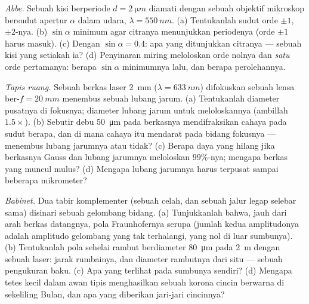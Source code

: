 \begin{exercise}[$\star\star$]\label{exo:b2:diffraction:8}
\emph{Abbe.} Sebuah kisi berperiode $d = \qty{2}{\micro m}$ diamati dengan sebuah
objektif mikroskop bersudut apertur $\alpha$ dalam udara, $\lambda = \qty{550}{nm}$.
(a) Tentukanlah sudut orde $\pm1$, $\pm2$-nya. (b) $\sin\alpha$ minimum agar citranya
menunjukkan periodenya (orde $\pm1$ harus masuk). (c) Dengan $\sin\alpha = 0.4$: apa
yang ditunjukkan citranya --- sebuah kisi yang setiakah ia? (d) Penyinaran
miring meloloskan orde nolnya dan \emph{satu} orde pertamanya:
berapa $\sin\alpha$ minimumnya lalu, dan berapa perolehannya.
\end{exercise}

\begin{exercise}[$\star\star$]\label{exo:b2:diffraction:9}
\emph{Tapis ruang.} Sebuah berkas laser \qty{2}{mm} ($\lambda = \qty{633}{nm}$)
difokuskan sebuah lensa ber-$f = \qty{20}{mm}$ menembus sebuah lubang jarum. (a) Tentukanlah diameter
 pusatnya di fokusnya; diameter lubang jarum untuk meloloskannya
(ambillah $1.5\times$). (b) Sebutir debu \qty{50}{\micro m} pada berkasnya
mendifraksikan cahaya pada sudut berapa, dan di mana cahaya itu mendarat pada bidang
fokusnya --- menembus lubang jarumnya atau tidak? (c) Berapa daya yang hilang jika berkasnya
Gauss dan lubang jarumnya meloloskan $99\%$-nya; mengapa berkas yang muncul
mulus? (d) Mengapa lubang jarumnya harus terpusat sampai beberapa
mikrometer?
\end{exercise}

\begin{exercise}[$\star\star\star$]\label{exo:b2:diffraction:10}
\emph{Babinet.} Dua tabir komplementer (sebuah celah, dan sebuah jalur
legap selebar sama) disinari sebuah gelombang bidang. (a) Tunjukkanlah bahwa, jauh
dari arah berkas datangnya, pola Fraunhofernya
serupa (jumlah kedua amplitudonya adalah amplitudo gelombang yang
tak terhalangi, yang nol di luar sumbunya). (b) Tentukanlah pola sehelai rambut
berdiameter \qty{80}{\micro m} pada \qty{2}{m} dengan sebuah laser: jarak rumbainya, dan
diameter rambutnya dari situ --- sebuah pengukuran baku. (c) Apa yang terlihat
pada sumbunya sendiri? (d) Mengapa tetes kecil dalam awan tipis menghasilkan sebuah
korona cincin berwarna di sekeliling Bulan, dan apa yang diberikan jari-jari
cincinnya?
\end{exercise}


